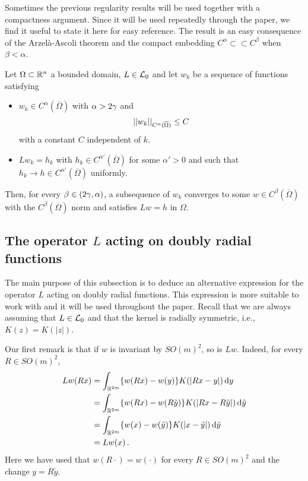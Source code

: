 Sometimes the previous regularity results will be used together with a compactness argument. Since
it will be used repeatedly through the paper, we find it useful to state it here for easy
reference. The result is an easy consequence of the Arzelà-Ascoli theorem and the compact embedding
$C^\alpha \subset \subset C^\beta$ when $\beta < \alpha$.

\begin{lemma}
\label{Lemma:CompactnessLemma} Let $\Omega\subset \mathbb{R}^n$ a bounded domain, $L\in \mathcal{L}_0$ and let
$w_k$ be a sequence of functions satisfying
\begin{itemize}
\item $w_k \in C^\alpha (\overline{\Omega})$ with $\alpha > 2\gamma$ and
$$
\left | \left |{w_k} \right | \right |_{C^\alpha (\overline{\Omega})} \leq C
$$
with a constant $C$ independent of $k$.
\item $L w_k = h_k$ with $h_k \in C^{\alpha'}(\overline{\Omega})$ for some $\alpha' > 0$ and such
    that $h_k \to h \in C^{\alpha'}(\overline{\Omega})$ uniformly.
\end{itemize}
Then, for every $\beta \in (2\gamma, \alpha)$, a subsequence of $w_k$ converges to some $w \in C^\beta
(\overline{\Omega})$ with the $C^\beta (\overline{\Omega})$ norm and satisfies $Lw = h$ in
$\Omega$.
\end{lemma}

\subsection{The operator $L$ acting on doubly radial functions}

The main purpose of this subsection is to deduce an alternative expression for the operator $L$
acting on doubly radial functions. This expression is more suitable to work with and it will be
used throughout the paper. Recall that we are always assuming that $L\in \mathcal{L}_0$ and that the
kernel is radially symmetric, i.e., $K(z) = K(|z|)$.

Our first remark is that if $w$ is invariant by $SO(m)^2$, so is $Lw$. Indeed, for every $R \in
SO(m)^2$,
\begin{align*}
Lw (Rx)
& = \int_{\mathbb{R}^{2m}} \{w(Rx) - w(y)\} K(|Rx - y|)  \,\mathrm{d} y\\
& = \int_{\mathbb{R}^{2m}} \{w(Rx) - w(R\tilde{y})\} K(|Rx - R\tilde{y}|) \,\mathrm{d} \tilde{y}\\
& = \int_{\mathbb{R}^{2m}} \{w(x) - w(\tilde{y})\} K(|x-\tilde{y}|) \,\mathrm{d} \tilde{y}\\
& = Lw (x)\,.
\end{align*}
Here we have used that $w(R \cdot) = w(\cdot)$ for every $R\in SO(m)^2$ and the change $y =
R\tilde{y}$.



